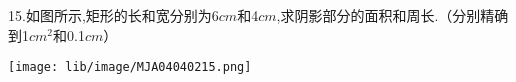 15.如图所示,矩形的长和宽分别为6$cm$和4$cm$,求阴影部分的面积和周长.（分别精确到1$cm^2$和0.1$cm$）

\begin{flushright}

    \texttt{[image: lib/image/MJA04040215.png]}

\end{flushright}



